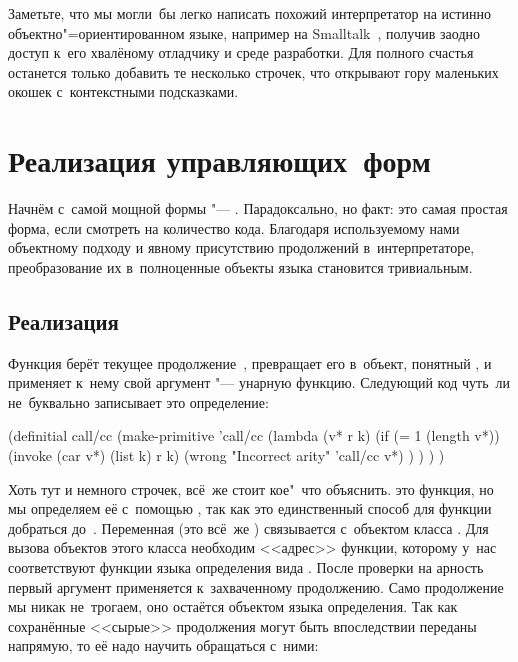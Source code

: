 Заметьте, что мы могли~бы легко написать похожий интерпретатор на истинно
объектно"=ориентированном языке, например на Smalltalk~\cite{gr83}, получив
заодно доступ к~его хвалёному отладчику и среде разработки. Для полного счастья
останется только добавить те несколько строчек, что открывают гору маленьких
окошек с~контекстными подсказками.


\section{Реализация управляющих~форм}\label{escape/sect:implementation}

Начнём с~самой мощной формы "--- . Парадоксально, но факт: это самая
простая форма, если смотреть на количество кода. Благодаря используемому нами
объектному подходу и явному присутствию продолжений в~интерпретаторе,
преобразование их в~полноценные объекты языка становится тривиальным.


\subsection{\texorpdfstring%
{Реализация \protect{}}%
{Реализация call/cc}}%
\label{escape/implementation/ssect:call/cc}

Функция  берёт текущее продолжение~, превращает его в~объект,
понятный , и применяет к~нему свой аргумент "--- унарную функцию.
Следующий код чуть~ли не~буквально записывает это определение:

\begin{code:lisp}
(definitial call/cc
  (make-primitive
   'call/cc
   (lambda (v* r k)
     (if (= 1 (length v*))
         (invoke (car v*) (list k) r k)
         (wrong "Incorrect arity" 'call/cc v*) ) ) ) )
\end{code:lisp}

Хоть тут и немного строчек, всё~же стоит кое"~что объяснить.  это
функция, но мы определяем её с~помощью , так как это
единственный способ для функции добраться до~. Переменная 
(это всё~же ) связывается с~объектом класса . Для вызова
объектов этого класса необходим <<адрес>> функции, которому у~нас соответствуют
функции языка определения вида . После проверки на
арность первый аргумент  применяется к~захваченному продолжению.
Само продолжение мы никак не~трогаем, оно остаётся объектом языка определения.
Так как сохранённые <<сырые>> продолжения могут быть впоследствии переданы
 напрямую, то её надо научить обращаться с~ними:

